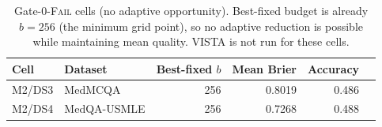 \begin{table}[t]
\centering
\caption{%
  Gate-0-\textsc{Fail} cells (no adaptive opportunity).
  Best-fixed budget is already $b=256$ (the minimum grid point),
  so no adaptive reduction is possible while maintaining mean quality.
  VISTA is not run for these cells.
}
\label{tab:vista-noopportunity}
\begin{tabular}{@{}llrrrr@{}}
\toprule
Cell & Dataset & Best-fixed $b$ & Mean Brier & Accuracy \\
\midrule
M2/DS3 & MedMCQA & 256 & 0.8019 & 0.486 \\
M2/DS4 & MedQA-USMLE & 256 & 0.7268 & 0.488 \\
\bottomrule
\end{tabular}
\end{table}